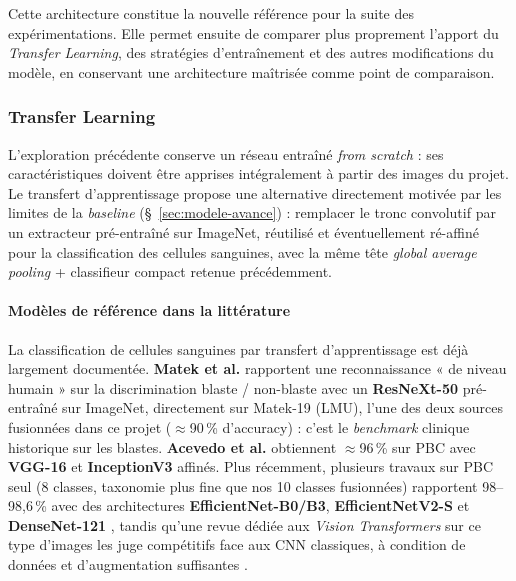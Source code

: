 Cette architecture constitue la nouvelle référence pour la suite des expérimentations.
Elle permet ensuite de comparer plus proprement l'apport du \textit{Transfer Learning}, des stratégies d'entraînement et des autres modifications du modèle, en conservant une architecture maîtrisée comme point de comparaison.

\subsubsection{Transfer Learning}
\label{sec:transfer-learning}

L'exploration précédente conserve un réseau entraîné \emph{from scratch} : ses caractéristiques doivent être apprises intégralement à partir des images du projet.
Le transfert d'apprentissage propose une alternative directement motivée par les limites de la \emph{baseline} (\S~\ref{sec:modele-avance}) : remplacer le tronc convolutif par un extracteur pré-entraîné sur ImageNet, réutilisé et éventuellement ré-affiné pour la classification des cellules sanguines, avec la même tête \emph{global average pooling} + classifieur compact retenue précédemment.
\paragraph{Modèles de référence dans la littérature}
 
La classification de cellules sanguines par transfert d'apprentissage est déjà largement documentée.
\textbf{Matek et al.} \parencite{matek2019nmi} rapportent une reconnaissance « de niveau humain » sur la discrimination blaste / non-blaste avec un \textbf{ResNeXt-50} pré-entraîné sur ImageNet, directement sur Matek-19 (LMU), l'une des deux sources fusionnées dans ce projet ($\approx$90\,\% d'accuracy) : c'est le \emph{benchmark} clinique historique sur les blastes.
\textbf{Acevedo et al.} \parencite{acevedo2019cnn} obtiennent $\approx$96\,\% sur PBC avec \textbf{VGG-16} et \textbf{InceptionV3} affinés.
Plus récemment, plusieurs travaux sur PBC seul (8 classes, taxonomie plus fine que nos 10 classes fusionnées) rapportent 98--98,6\,\% avec des architectures \textbf{EfficientNet-B0/B3}, \textbf{EfficientNetV2-S} et \textbf{DenseNet-121} \parencite{asghar2024tenclasses,asghar2023allbloodcell}, tandis qu'une revue dédiée aux \emph{Vision Transformers} sur ce type d'images les juge compétitifs face aux CNN classiques, à condition de données et d'augmentation suffisantes \parencite{abouali2023wbcvit}.


